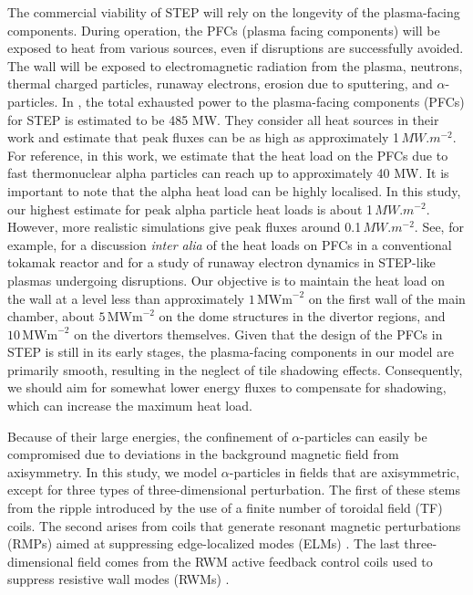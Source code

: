 \documentclass[10pt, a4paper, twoside]{article}
\begin{document}
The commercial viability of STEP will rely on the longevity of the plasma-facing components. During operation, the PFCs (plasma facing components) will be exposed to heat from various sources, even if disruptions are successfully avoided. The wall will be exposed to electromagnetic radiation from the plasma, neutrons, thermal charged particles, runaway electrons, erosion due to sputtering, and $\alpha$-particles.
In \cite{vaccaro2024}, the total exhausted power to the plasma-facing components (PFCs) for STEP is estimated to be 485 MW. They consider all heat sources in their work and estimate that peak fluxes can be as high as approximately 1\,$\si{MW.m^{-2}}$. For reference, in this work, we estimate that the heat load on the PFCs due to fast thermonuclear alpha particles can reach up to approximately 40 MW. It is important to note that the alpha heat load can be highly localised. In this study, our highest estimate for peak alpha particle heat loads is about 1\,$\si{MW.m^{-2}}$. However, more realistic simulations give peak fluxes around 0.1\,$\si{MW.m^{-2}}$.
See, for example, \cite{bachmann2018} for a discussion {\it inter alia} of the heat loads on PFCs in a conventional tokamak reactor and \cite{Berger2022} for a study of runaway electron dynamics in STEP-like plasmas undergoing disruptions. Our objective is to maintain the heat load on the wall at a level less than approximately $1\, \text{MWm}^{-2}$ on the first wall of the main chamber, about $5\, \text{MWm}^{-2}$ on the dome structures in the divertor regions, and $10\, \text{MWm}^{-2}$ on the divertors themselves. Given that the design of the PFCs in STEP is still in its early stages, the plasma-facing components in our model are primarily smooth, resulting in the neglect of tile shadowing effects. Consequently, we should aim for somewhat lower energy fluxes to compensate for shadowing, which can increase the maximum heat load.

Because of their large energies, the confinement of $\alpha$-particles can easily be compromised due to deviations in the background magnetic field from axisymmetry.  In this study, we model $\alpha$-particles in fields that are axisymmetric, except for three types of three-dimensional perturbation. The first of these stems from the ripple introduced by the use of a finite number of toroidal field (TF) coils. The second arises from coils that generate resonant magnetic perturbations (RMPs) aimed at suppressing edge-localized modes (ELMs) \cite{zohm1996}. The last three-dimensional field comes from the RWM active feedback control coils used to suppress resistive wall modes (RWMs) \cite{xia2023}.
\end{document}
